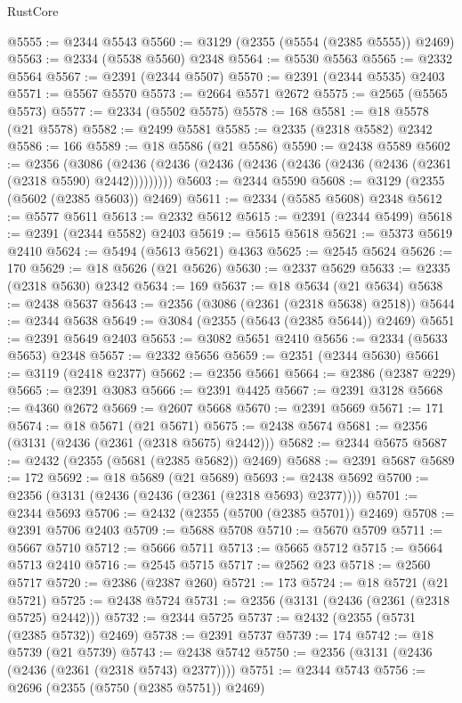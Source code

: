 \begin{lexlean}{RustCore}
\begin{coremodule}
@5555 := @2344 @5543
@5560 := @3129 (@2355 (@5554 (@2385 @5555)) @2469)
@5563 := @2334 (@5538 @5560) @2348
@5564 := @5530 @5563
@5565 := @2332 @5564
@5567 := @2391 (@2344 @5507)
@5570 := @2391 (@2344 @5535) @2403
@5571 := @5567 @5570
@5573 := @2664 @5571 @2672
@5575 := @2565 (@5565 @5573)
@5577 := @2334 (@5502 @5575)
@5578 := 168
@5581 := @18 @5578 (@21 @5578)
@5582 := @2499 @5581
@5585 := @2335 (@2318 @5582) @2342
@5586 := 166
@5589 := @18 @5586 (@21 @5586)
@5590 := @2438 @5589
@5602 := @2356
    (@3086 (@2436 (@2436 (@2436 (@2436 (@2436 (@2436 (@2436 (@2361 (@2318 @5590) @2442)))))))))
@5603 := @2344 @5590
@5608 := @3129 (@2355 (@5602 (@2385 @5603)) @2469)
@5611 := @2334 (@5585 @5608) @2348
@5612 := @5577 @5611
@5613 := @2332 @5612
@5615 := @2391 (@2344 @5499)
@5618 := @2391 (@2344 @5582) @2403
@5619 := @5615 @5618
@5621 := @5373 @5619 @2410
@5624 := @5494 (@5613 @5621) @4363
@5625 := @2545 @5624
@5626 := 170
@5629 := @18 @5626 (@21 @5626)
@5630 := @2337 @5629
@5633 := @2335 (@2318 @5630) @2342
@5634 := 169
@5637 := @18 @5634 (@21 @5634)
@5638 := @2438 @5637
@5643 := @2356 (@3086 (@2361 (@2318 @5638) @2518))
@5644 := @2344 @5638
@5649 := @3084 (@2355 (@5643 (@2385 @5644)) @2469)
@5651 := @2391 @5649 @2403
@5653 := @3082 @5651 @2410
@5656 := @2334 (@5633 @5653) @2348
@5657 := @2332 @5656
@5659 := @2351 (@2344 @5630)
@5661 := @3119 (@2418 @2377)
@5662 := @2356 @5661
@5664 := @2386 (@2387 @229)
@5665 := @2391 @3083
@5666 := @2391 @4425
@5667 := @2391 @3128
@5668 := @4360 @2672
@5669 := @2607 @5668
@5670 := @2391 @5669
@5671 := 171
@5674 := @18 @5671 (@21 @5671)
@5675 := @2438 @5674
@5681 := @2356 (@3131 (@2436 (@2361 (@2318 @5675) @2442)))
@5682 := @2344 @5675
@5687 := @2432 (@2355 (@5681 (@2385 @5682)) @2469)
@5688 := @2391 @5687
@5689 := 172
@5692 := @18 @5689 (@21 @5689)
@5693 := @2438 @5692
@5700 := @2356 (@3131 (@2436 (@2436 (@2361 (@2318 @5693) @2377))))
@5701 := @2344 @5693
@5706 := @2432 (@2355 (@5700 (@2385 @5701)) @2469)
@5708 := @2391 @5706 @2403
@5709 := @5688 @5708
@5710 := @5670 @5709
@5711 := @5667 @5710
@5712 := @5666 @5711
@5713 := @5665 @5712
@5715 := @5664 @5713 @2410
@5716 := @2545 @5715
@5717 := @2562 @23
@5718 := @2560 @5717
@5720 := @2386 (@2387 @260)
@5721 := 173
@5724 := @18 @5721 (@21 @5721)
@5725 := @2438 @5724
@5731 := @2356 (@3131 (@2436 (@2361 (@2318 @5725) @2442)))
@5732 := @2344 @5725
@5737 := @2432 (@2355 (@5731 (@2385 @5732)) @2469)
@5738 := @2391 @5737
@5739 := 174
@5742 := @18 @5739 (@21 @5739)
@5743 := @2438 @5742
@5750 := @2356 (@3131 (@2436 (@2436 (@2361 (@2318 @5743) @2377))))
@5751 := @2344 @5743
@5756 := @2696 (@2355 (@5750 (@2385 @5751)) @2469)

\end{coremodule}
\end{lexlean}

